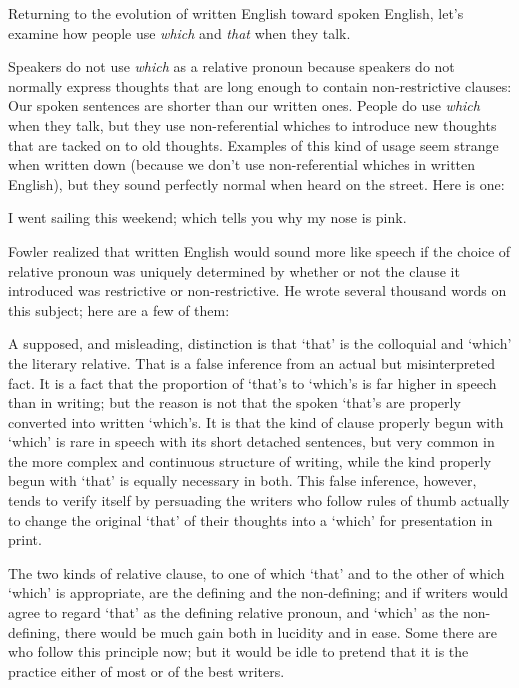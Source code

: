 Returning to the evolution of written English toward  spoken
English, let's examine how people use {\it which\/} and {\it that\/} 
when they talk.

Speakers do not use {\it which\/} as a relative pronoun because speakers do not
normally express thoughts that are long enough to contain non-restrictive
clauses: Our spoken sentences are shorter than our written ones. People do
use {\it which\/} when they talk, but they use non-referential whiches to
introduce new thoughts that are tacked on to old thoughts.  Examples of
this kind of usage seem strange when written down (because we don't use
non-referential whiches in written English), but they sound perfectly normal
when heard on the street.  Here is one:

\nobreak\smallskip
{\obeylines
\qquad\qquad\qquad I went sailing this weekend; which tells you why my nose is pink.
}

\smallskip
Fowler realized that written English would sound more like speech if the
choice of relative pronoun was uniquely determined by whether or not the
clause it introduced was restrictive or non-restrictive.  He wrote several
thousand words on this subject; here are a few of them: 

{\narrower\smallskip\noindent
    A supposed, and misleading, distinction is that `that' is the
    colloquial and `which' the literary relative.  That is a false
    inference from an actual but misinterpreted fact.  It is a fact
    that the proportion of `that's to `which's is far higher in speech
    than in writing; but the reason is not that the spoken `that's
    are properly converted into written `which's.  It is that the
    kind of clause properly begun with `which' is rare in speech with
    its short detached sentences, but very common in the more complex
    and continuous structure of writing, while the kind properly begun
    with `that' is equally necessary in both.  This false inference,
    however, tends to verify itself by persuading the writers who
    follow rules of thumb actually to change the original `that' of
    their thoughts into a `which' for presentation in print.

    The two kinds of relative clause, to one of which `that' and to
    the other of which `which' is appropriate, are the defining and
    the non-defining; and if writers would agree to regard `that'
    as the defining relative pronoun, and `which' as the non-defining,
    there would be much gain both in lucidity and in ease.  Some there
    are who follow this principle now; but it would be idle to pretend
    that it is the practice either of most or of the best writers.
\smallskip}

